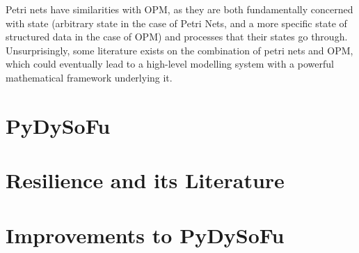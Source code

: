 \documentclass[draft]{report}
\begin{document}
Petri nets have similarities with OPM, as they are both fundamentally concerned
with state (arbitrary state in the case of Petri Nets, and a more specific state
of structured data in the case of OPM) and processes that their states go
through. Unsurprisingly, some literature exists on the combination of petri nets
and OPM, which could eventually lead to a high-level modelling system with a
powerful mathematical framework underlying it.\par












\section{PyDySoFu}
\label{sec:pydysofu}








\section{Resilience and its Literature}
\label{sec:resilience}






\section{Improvements to PyDySoFu}
\label{sec:pdsf_improvements}
\end{document}
